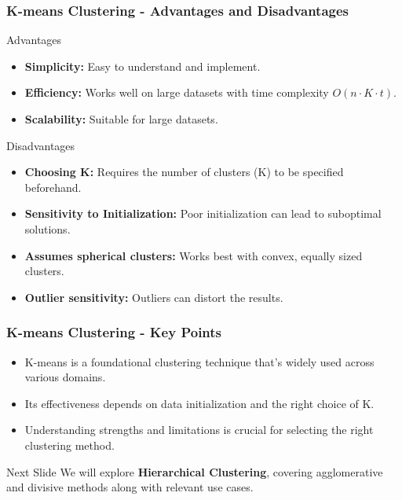 \documentclass[aspectratio=169]{beamer}
\begin{document}
\begin{frame}[fragile]
    \frametitle{K-means Clustering - Advantages and Disadvantages}
    \begin{block}{Advantages}
        \begin{itemize}
            \item \textbf{Simplicity:} Easy to understand and implement.
            \item \textbf{Efficiency:} Works well on large datasets with time complexity \( O(n \cdot K \cdot t) \).
            \item \textbf{Scalability:} Suitable for large datasets.
        \end{itemize}
    \end{block}
    \begin{block}{Disadvantages}
        \begin{itemize}
            \item \textbf{Choosing K:} Requires the number of clusters (K) to be specified beforehand.
            \item \textbf{Sensitivity to Initialization:} Poor initialization can lead to suboptimal solutions.
            \item \textbf{Assumes spherical clusters:} Works best with convex, equally sized clusters.
            \item \textbf{Outlier sensitivity:} Outliers can distort the results.
        \end{itemize}
    \end{block}
\end{frame}

\begin{frame}[fragile]
    \frametitle{K-means Clustering - Key Points}
    \begin{itemize}
        \item K-means is a foundational clustering technique that's widely used across various domains.
        \item Its effectiveness depends on data initialization and the right choice of K.
        \item Understanding strengths and limitations is crucial for selecting the right clustering method.
    \end{itemize}
    \begin{block}{Next Slide}
        We will explore \textbf{Hierarchical Clustering}, covering agglomerative and divisive methods along with relevant use cases.
    \end{block}
\end{frame}
\end{document}
